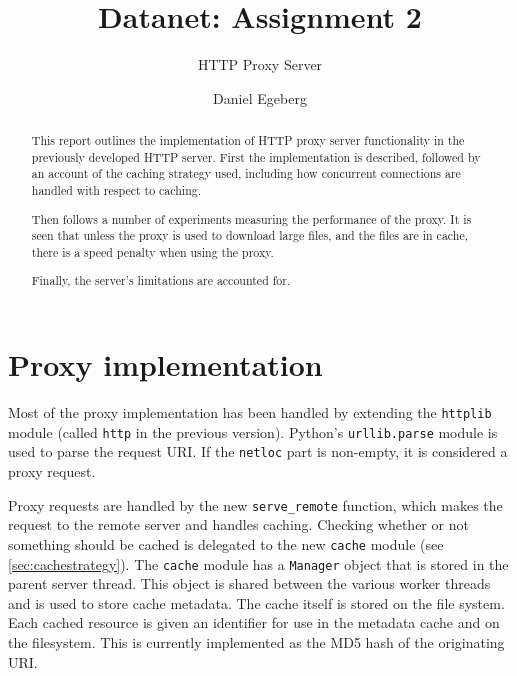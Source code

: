 \documentclass{sig-alternate}
\begin{document}
\title{Datanet: Assignment 2}
\subtitle{HTTP Proxy Server}


\author{
\alignauthor
    Daniel Egeberg\\
}

\maketitle

\begin{abstract}
    This report outlines the implementation of HTTP proxy server functionality
    in the previously developed HTTP server. First the implementation is
    described, followed by an account of the caching strategy used, including
    how concurrent connections are handled with respect to caching.

    Then follows a number of experiments measuring the performance of the
    proxy. It is seen that unless the proxy is used to download large files,
    and the files are in cache, there is a speed penalty when using the proxy.

    Finally, the server's limitations are accounted for.
\end{abstract}

\section{Proxy implementation}
\label{sec:implementation}

Most of the proxy implementation has been handled by extending the
\verb+httplib+ module (called \verb+http+ in the previous version). Python's
\verb+urllib.parse+ module is used to parse the request URI. If the
\verb+netloc+ part is non-empty, it is considered a proxy request.

Proxy requests are handled by the new \verb+serve_remote+ function, which
makes the request to the remote server and handles caching. Checking whether
or not something should be cached is delegated to the new \verb+cache+
module (see \autoref{sec:cachestrategy}). The \verb+cache+ module has a
\verb+Manager+ object that is stored in the parent server thread. This object
is shared between the various worker threads and is used to store cache
metadata. The cache itself is stored on the file system. Each cached resource
is given an identifier for use in the metadata cache and on the filesystem.
This is currently implemented as the MD5 hash of the originating URI.
\end{document}
